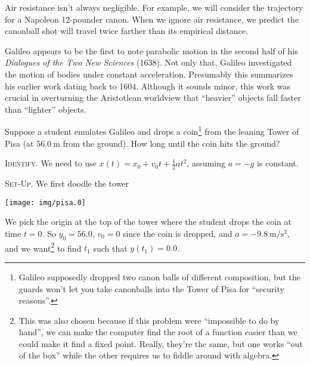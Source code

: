 \begin{rmk}[Assumptions]
Air resistance isn't always negligible. For example, we will consider
the trajectory for a Napoleon 12-pounder canon. When we ignore air
resistance, we predict the canonball shot will travel twice farther
than its empirical distance.
\end{rmk}

\begin{rmk}
Galileo appears to be the first to note parabolic motion in the second
half of his \emph{Dialogues of the Two New Sciences} (1638). Not only
that, Galileo investigated the motion of bodies under constant
acceleration. Presumably this summarizes his earlier work dating back to
1604. Although it sounds minor, this work was crucial in overturning the
Aristotlean worldview that ``heavier'' objects fall faster than
``lighter'' objects. 
\end{rmk}

\workedExamples{}

Suppose a student emulates Galileo and drops a coin\footnote{Galileo
  supposedly dropped two canon balls of different composition, but
  the guards won't let you take canonballs into the Tower of Pisa for
  ``security reasons''.} from the
leaning Tower of Pisa (at $\SI{56.0}{\meter}$ from the ground). How
long until the coin hits the ground? 

\textsc{Identify.} We need to use
$x(t)=x_{0}+v_{0}t+\frac{1}{2}at^{2}$, assuming $a=-g$ is
constant. 

\textsc{Set-Up.}
We first doodle the tower
\begin{center}
  \texttt{[image: img/pisa.0]}
\end{center}
We pick the origin at the top of the tower where the student
drops the coin at time $t=0$. So $y_{0}=56.0$, $v_{0}=0$ since the
coin is dropped, and $a=\SI{-9.8}{\meter\per\second\squared}$, and we
want\footnote{This was also chosen because if this problem were
  ``impossible to do by hand'', we can make the computer find the root
  of a function easier than we could make it find a fixed point. Really,
they're the same, but one works ``out of the box'' while the other
requires us to fiddle around with algebra.} to find $t_{1}$ such that $y(t_{1})=0.0$.

